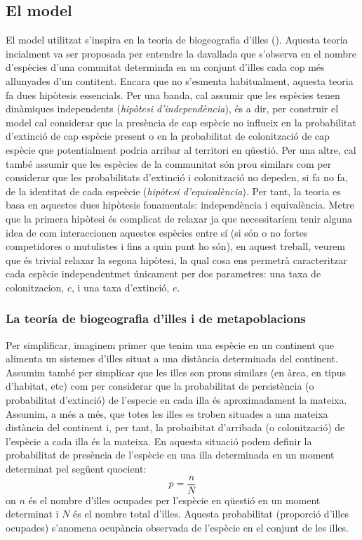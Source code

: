 \documentclass{article}
\begin{document}
\subsection{El model}
El model utilitzat s'inspira en la teoria de biogeografia d'illes (\cite{MacArthurWilson67}). Aquesta teoria incialment va ser proposada per entendre la davallada que s'observa en el nombre d'esp\`ecies d'una comunitat determinda en un conjunt d'illes cada cop m\'es allunyades d'un contitent. Encara que no s'esmenta habitualment, aquesta teoria fa dues hip\`otesis essencials. Per una banda, cal assumir que les esp\`ecies tenen din\`amiques independents ({\it hip\`otesi d'independ\`encia}), \'es a dir, per construir el model cal considerar que la pres\`encia de cap esp\`ecie no influeix en la probabilitat d'extinci\'o de cap esp\`ecie present o en la probabilitat de colonitzaci\'o de cap esp\`ecie que potentialment podria arribar al territori en q\"uesti\'o. Per una altre, cal tamb\'e assumir que les esp\`ecies de la communitat s\'on prou similars com per considerar que les probabilitats d'extinci\'o i colonitzaci\'o no depeden, si fa no fa, de la identitat de cada espe\`ecie ({\it hip\`otesi d'equival\`encia}). Per tant, la teoria es basa en aquestes dues hip\`otesis fonamentals: independ\`encia i equival\`encia. Metre que la primera hip\`otesi \'es complicat de relaxar ja que necessitar\'iem tenir alguna idea de com interaccionen aquestes esp\`ecies entre s\'i (si s\'on o no fortes competidores o mutulistes i fins a quin punt ho s\'on), en aquest treball, veurem que \'es trivial relaxar la segona hip\`otesi, la qual cosa ens permetr\`a caracteritzar cada esp\`ecie independentmet \'unicament per dos parametres: una taxa de colonitzacion, $c$, i una taxa d'extinci\'o, $e$. 

\subsubsection{La teor\'ia de biogeografia d'illes i de metapoblacions}
Per simplificar, imaginem primer que tenim una esp\`ecie en un continent que alimenta un sistemes d'illes situat a una dist\`ancia determinada del continent. Assumim tamb\'e per simplicar que les illes son prous similars (en \`area, en tipus d'habitat, etc) com per considerar que la probabilitat de persist\`encia (o probabilitat d'extinci\'o) de l'especie en cada illa \'es aproximadament la mateixa. Assumim, a m\'es a m\'es, que totes les illes es troben situades a una mateixa dist\`ancia del continent i, per tant, la probaibitat d'arribada (o colonitzaci\'o) de l'esp\`ecie a cada illa \'es la mateixa. En aquesta situaci\'o podem definir la probabilitat de pres\`encia de l'esp\`ecie en una illa determinada en un moment determinat pel seg\"uent quocient: 
\begin{equation}
    p = \frac{n}{N}
    \label{eq:ocupancia}
\end{equation}
on $n$ \'es el nombre d'illes ocupades per l'esp\`ecie en q\"uesti\'o en un moment determinat i $N$ \'es el nombre total d'illes. Aquesta probabilitat (proporci\'o d'illes ocupades) s'anomena ocup\`ancia observada de l'esp\`ecie en el conjunt de les illes. 
\smallskip
\end{document}
